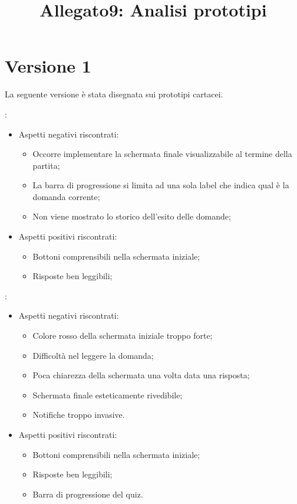 \documentclass{article}
\title{\textbf{Allegato9: Analisi prototipi}}
\date{}
\begin{document}
\maketitle

\section{Versione 1}
La seguente versione è stata disegnata sui prototipi cartacei.
\begin{description}
\addtolength{\itemindent}{0.5cm}

\item [Quiz Giornaliero] :
\begin{itemize}
	\item Aspetti negativi riscontrati:
		\begin{itemize}
		\item Occorre implementare la schermata finale visualizzabile al termine della partita;
        \item La barra di progressione si limita ad una sola label che indica qual è la domanda corrente;
        \item Non viene mostrato lo storico dell’esito delle domande;
        \end{itemize}
	\item Aspetti positivi riscontrati:
		\begin{itemize}
        \item Bottoni comprensibili nella schermata iniziale;
        \item Risposte ben leggibili;
        \end{itemize}
	\end{itemize}
\item [Quiz Settimanale]:
	\begin{itemize}
	\item Aspetti negativi riscontrati:
		\begin{itemize}
		\item Colore rosso della schermata iniziale troppo forte;
		\item Difficoltà nel leggere la domanda;
		\item Poca chiarezza della schermata una volta data una risposta;
		\item Schermata finale esteticamente rivedibile;
		\item Notifiche troppo invasive.
	\end{itemize}
	\item Aspetti positivi riscontrati:
	\begin{itemize}
		\item Bottoni comprensibili nella schermata iniziale;
		\item Risposte ben leggibili;
		\item Barra di progressione del quiz.
	\end{itemize}
\end{itemize}


\end{description}
\end{document}
